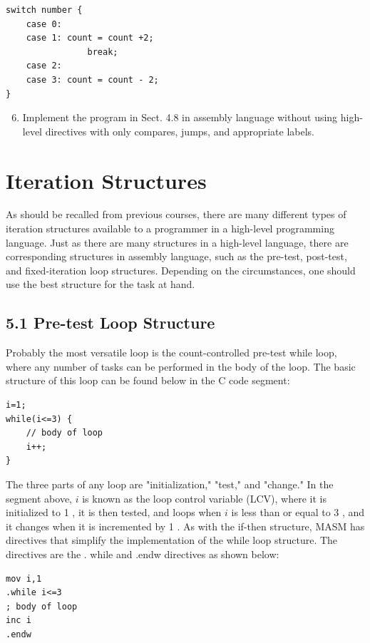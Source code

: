 \documentclass[10pt]{book}
\begin{document}
\begin{verbatim}
switch number {
    case 0:
    case 1: count = count +2;
                break;
    case 2:
    case 3: count = count - 2;
}
\end{verbatim}

\begin{enumerate}
  \setcounter{enumi}{5}
  \item Implement the program in Sect. 4.8 in assembly language without using high-level directives with only compares, jumps, and appropriate labels.
\end{enumerate}

\section*{Iteration Structures}
As should be recalled from previous courses, there are many different types of iteration structures available to a programmer in a high-level programming language. Just as there are many structures in a high-level language, there are corresponding structures in assembly language, such as the pre-test, post-test, and fixed-iteration loop structures. Depending on the circumstances, one should use the best structure for the task at hand.

\subsection*{5.1 Pre-test Loop Structure}
Probably the most versatile loop is the count-controlled pre-test while loop, where any number of tasks can be performed in the body of the loop. The basic structure of this loop can be found below in the C code segment:

\begin{verbatim}
i=1;
while(i<=3) {
    // body of loop
    i++;
}
\end{verbatim}

The three parts of any loop are "initialization," "test," and "change." In the segment above, $i$ is known as the loop control variable (LCV), where it is initialized to 1 , it is then tested, and loops when $i$ is less than or equal to 3 , and it changes when it is incremented by 1 . As with the if-then structure, MASM has directives that simplify the implementation of the while loop structure. The directives are the . while and .endw directives as shown below:

\begin{verbatim}
mov i,1
.while i<=3
; body of loop
inc i
.endw
\end{verbatim}
\end{document}
